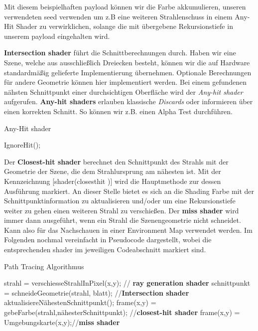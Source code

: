 Mit diesem beispielhaften payload können wir die Farbe akkumulieren, unseren verwendeten 
seed verwenden um z.B eine weiteren Strahlenschuss in einem Any-Hit Shader zu verwirklichen,  
solange die mit übergebene Rekursionstiefe in unserem payload eingehalten wird.  

\textbf{Intersection shader} führt die Schnittberechnungen durch.
Haben wir eine Szene, welche aus ausschließlich Dreiecken besteht, können wir
die auf Hardware standardmäßig gelieferte Implementierung übernehmen. 
Optionale Berechnungen für andere Geometrie können hier implementiert werden.
Bei einem gefundenen nähsten Schnittpunkt einer durchsichtigen Oberfläche wird der 
\textit{Any-hit shader} aufgerufen.
\textbf{Any-hit shaders} erlauben klassische \textit{Discards} oder informieren
über einen korrekten Schnitt. So können wir z.B. einen Alpha Test durchführen.

\begin{algorithm}[H]
    \caption{Any-Hit shader}
    \begin{algorithmic}[1]
        \State IgnoreHit();
        \EndIf
    \end{algorithmic}
    \label{alg:any hit}
\end{algorithm}

Der \textbf{Closest-hit shader} berechnet den Schnittpunkt des Strahls mit der Geometrie
der Szene, die dem Strahlursprung am nähesten ist.
Mit der Kennzeichnung [shader(\dq closesthit \dq)] wird die Hauptmethode zur 
dessen Ausführung markiert. An dieser Stelle bietet es sich an die Shading Farbe 
mit der Schnittpunktinformation zu aktualisieren und/oder um eine Rekursionstiefe weiter 
zu gehen einen weiteren Strahl zu verschießen. 
Der \textbf{miss shader} wird immer dann ausgeführt, wenn ein Strahl die
Szenengeometrie nicht schneidet. Kann also für das Nachschauen in einer 
Environment Map verwendet werden. Im Folgenden 
nochmal vereinfacht in Pseudocode dargestellt, wobei die entsprechenden shader
im jeweiligen Codeabschnitt markiert sind.

\begin{algorithm}[H]
    \caption{Path Tracing Algorithmus}
    \begin{algorithmic}[1]
        \State strahl = verschiesseStrahlInPixel(x,y); // \textbf{ray generation shader}
        \State schnittpunkt = schneideGeometrie(strahl, blatt); //\textbf{Intersection shader}
        \State aktualisiereNähestenSchnittpunkt();
        \EndIf
        \EndFor
        \State frame(x,y) = gebeFarbe(strahl,nähesterSchnittpunkt); //\textbf{closest-hit shader}
        \Else
        \State frame(x,y) = Umgebungskarte(x,y);//\textbf{miss shader}
        \EndIf
        \EndFor
        \EndProcedure
    \end{algorithmic}
    \label{alg:Path Tracer Konzept}
\end{algorithm}

